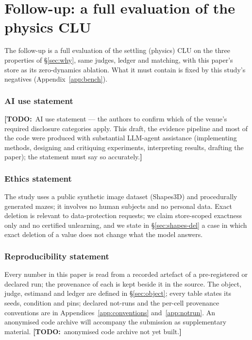 \documentclass{article} %
\newcommand{\TODO}[1]{{\color{orange}\textbf{[TODO:}~#1\textbf{]}}}
\begin{document}
\section{Follow-up: a full evaluation of the physics CLU}
\label{sec:followup}

The follow-up is a full evaluation of the settling (physics) CLU on the three properties of
\S\ref{sec:why}, same judges, ledger and matching, with this paper's store as its zero-dynamics
ablation. What it must contain is fixed by this study's negatives (Appendix~\ref{app:bench}).

\subsubsection*{AI use statement}
\TODO{AI use statement --- the authors to confirm which of the venue's required disclosure categories
apply. This draft, the evidence pipeline and most of the code were produced with substantial LLM-agent
assistance (implementing methods, designing and critiquing experiments, interpreting results,
drafting the paper); the statement must say so accurately.}

\subsubsection*{Ethics statement}
The study uses a public synthetic image dataset (Shapes3D) and procedurally generated mazes; it
involves no human subjects and no personal data. Exact deletion is relevant to data-protection
requests; we claim store-scoped exactness only and no certified unlearning, and we state in
\S\ref{sec:shapes-del} a case in which exact deletion of a value does not change what the model
answers.

\subsubsection*{Reproducibility statement}
Every number in this paper is read from a recorded artefact of a pre-registered or declared run;
the provenance of each is kept beside it in the source. The object, judge, estimand and ledger are
defined in \S\ref{sec:object}; every table states its seeds, condition and pins; declared
not-runs and the per-cell provenance conventions are in
Appendices~\ref{app:conventions} and~\ref{app:notrun}. An anonymised code archive will accompany the
submission as supplementary material. \TODO{anonymised code archive not yet built.}
\end{document}
